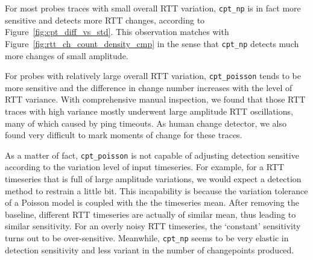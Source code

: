 For most probes traces with small overall RTT variation, \texttt{cpt\_np} is in fact more sensitive and detects more RTT changes, according to Figure~\ref{fig:cpt_diff_vs_std}.
This observation matches with Figure~\ref{fig:rtt_ch_count_density_cmp} in the sense that \texttt{cpt\_np} detects much more changes of small amplitude.

For probes with relatively large overall RTT variation, \texttt{cpt\_poisson} tends to be more sensitive and the difference in change number increases with the level of RTT variance.
With comprehensive manual inspection, we found that those RTT traces with high variance mostly underwent large amplitude RTT oscillations, many of which caused by ping timeouts. As human change detector, we also found very difficult to mark moments of change for these traces.

As a matter of fact, \texttt{cpt\_poisson} is not capable of adjusting detection sensitive according to the variation level of input timeseries.
For example, for a RTT timeseries that is full of large amplitude variations, 
we would expect a detection method to restrain a little bit.
This incapability is because the variation tolerance of a Poisson model is coupled with the the timeseries mean.
After removing the baseline, different RTT timeseries are actually of similar mean, thus leading to similar sensitivity.
For an overly noisy RTT timeseries, the `constant' sensitivity turns out to be over-sensitive.
Meanwhile,  \texttt{cpt\_np} seems to be very elastic in detection sensitivity and less variant in the number of changepoints produced.

